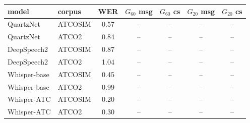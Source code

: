 \begin{tabular}{llccccc}
\toprule
model & corpus & WER & $G_{60}$ msg & $G_{60}$ cs & $G_{20}$ msg & $G_{20}$ cs \\
\midrule
QuartzNet & ATCOSIM & 0.57 & -- & -- & -- & -- \\
QuartzNet & ATCO2 & 0.84 & -- & -- & -- & -- \\
DeepSpeech2 & ATCOSIM & 0.87 & -- & -- & -- & -- \\
DeepSpeech2 & ATCO2 & 1.04 & -- & -- & -- & -- \\
Whisper-base & ATCOSIM & 0.45 & -- & -- & -- & -- \\
Whisper-base & ATCO2 & 0.99 & -- & -- & -- & -- \\
Whisper-ATC & ATCOSIM & 0.20 & -- & -- & -- & -- \\
Whisper-ATC & ATCO2 & 0.30 & -- & -- & -- & -- \\
\bottomrule
\end{tabular}
